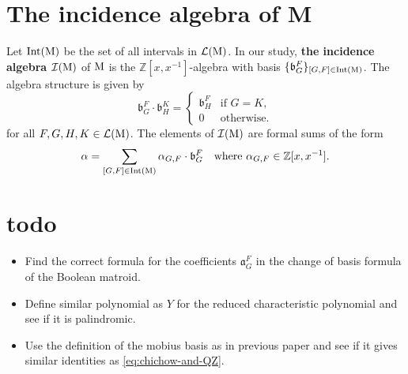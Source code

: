 \documentclass[11pt]{article}
\newcommand{\M}{\normalfont\text{M}}
\newcommand{\ZZ}{\mathbb{Z}}
\newcommand{\Ibasis}[2]{\mathfrak{b}^{#1}_{#2}}
\newcommand{\intM}{\normalfont\text{Int}}
\theoremstyle{remark}
\begin{document}
\section{The incidence algebra of M}

Let \(\intM(\M)\) be the set of all intervals in \(\mathcal{L}(\M)\).
In our study, \textbf{the incidence algebra \(\mathcal{I}(\M)\)} of \(\M\) is the
\(\ZZ[x, x^{-1}]\)-algebra with basis
\(\{\Ibasis{F}{G}\}_{[G,F] \in \intM(\M)}\). The algebra structure is given by
\[ \Ibasis{F}{G} \cdot \Ibasis{K}{H} = \begin{cases}
        \Ibasis{F}{H} & \text{if } G = K, \\
        0             & \text{otherwise}.
    \end{cases} \]
for all \(F, G, H, K \in \mathcal{L}(\M)\). The elements of \(\mathcal{I}(\M)\) are formal sums of the form
\[ \alpha = \sum_{[G,F] \in \intM(\M)} \alpha_{G,F} \cdot \Ibasis{F}{G} \quad \text{where } \alpha_{G,F} \in \ZZ[x, x^{-1}]. \]

\section{todo}
\begin{itemize}
    \item Find the correct formula for the coefficients \(\mathfrak{a}^{F}_{G}\) in the change of basis formula
          of the Boolean matroid.
    \item Define similar polynomial as \(Y\) for the reduced characteristic polynomial and see
          if it is palindromic.
    \item Use the definition of the mobius basis as in previous paper and see if it gives
          similar identities as \eqref{eq:chichow-and-QZ}.
\end{itemize}
\end{document}
